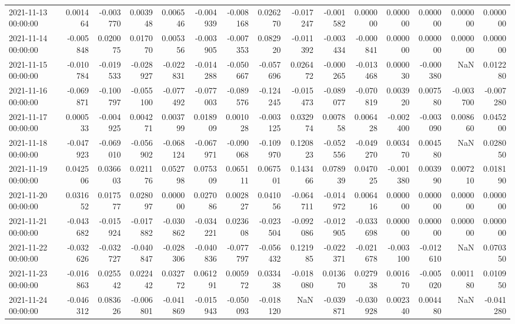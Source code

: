 \begin{tabular}{lrrrrrrrrrrrrrr}
2021-11-13 00:00:00 & 0.001464 & -0.003770 & 0.003948 & 0.006546 & -0.004939 & -0.008168 & 0.026270 & -0.017247 & -0.001582 & 0.000000 & 0.000000 & 0.000000 & 0.000000 & 0.000000 \\
2021-11-14 00:00:00 & -0.005848 & 0.020075 & 0.017070 & 0.005356 & -0.003905 & -0.007353 & 0.082920 & -0.011392 & -0.003434 & -0.000841 & 0.000000 & 0.000000 & 0.000000 & 0.000000 \\
2021-11-15 00:00:00 & -0.010784 & -0.019533 & -0.028927 & -0.022831 & -0.014288 & -0.050667 & -0.057696 & 0.026472 & -0.000265 & -0.013468 & 0.000030 & -0.000380 & NaN & 0.012280 \\
2021-11-16 00:00:00 & -0.069871 & -0.100797 & -0.055100 & -0.077492 & -0.077003 & -0.089576 & -0.124245 & -0.015473 & -0.089077 & -0.070819 & 0.003920 & 0.007580 & -0.003700 & -0.007280 \\
2021-11-17 00:00:00 & 0.000533 & -0.004925 & 0.004271 & 0.003799 & 0.018909 & 0.001028 & -0.003125 & 0.032974 & 0.007858 & 0.006428 & -0.002400 & -0.003090 & 0.008660 & 0.045200 \\
2021-11-18 00:00:00 & -0.047923 & -0.069010 & -0.056902 & -0.068124 & -0.067971 & -0.090068 & -0.109970 & 0.120823 & -0.052556 & -0.049270 & 0.003470 & 0.004580 & NaN & 0.028050 \\
2021-11-19 00:00:00 & 0.042506 & 0.036603 & 0.021176 & 0.052798 & 0.075309 & 0.065111 & 0.067501 & 0.143466 & 0.078939 & 0.047025 & -0.001380 & 0.003990 & 0.007210 & 0.018190 \\
2021-11-20 00:00:00 & 0.031652 & 0.017577 & 0.028097 & 0.000000 & 0.027086 & 0.002827 & 0.041056 & -0.064711 & -0.014972 & 0.006416 & 0.000000 & 0.000000 & 0.000000 & 0.000000 \\
2021-11-21 00:00:00 & -0.043682 & -0.015924 & -0.017882 & -0.030862 & -0.034221 & 0.023608 & -0.023504 & -0.092086 & -0.012905 & -0.033698 & 0.000000 & 0.000000 & 0.000000 & 0.000000 \\
2021-11-22 00:00:00 & -0.032626 & -0.032727 & -0.040847 & -0.028306 & -0.040836 & -0.077797 & -0.056432 & 0.121985 & -0.022371 & -0.021678 & -0.003100 & -0.012610 & NaN & 0.070350 \\
2021-11-23 00:00:00 & -0.016863 & 0.025542 & 0.022442 & 0.032772 & 0.061291 & 0.005972 & 0.033438 & -0.018080 & 0.013670 & 0.027938 & 0.001670 & -0.005020 & 0.001180 & 0.010950 \\
2021-11-24 00:00:00 & -0.046312 & 0.083626 & -0.006801 & -0.041869 & -0.015943 & -0.050093 & -0.018120 & NaN & -0.039871 & -0.030928 & 0.002340 & 0.004480 & NaN & -0.041280 \\

\end{tabular}
